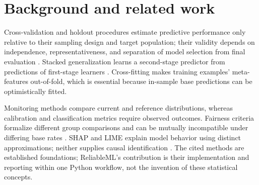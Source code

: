 \documentclass[conference]{IEEEtran}
\begin{document}
\section{Background and related work}
Cross-validation and holdout procedures estimate predictive performance only relative to their sampling design and target population; their validity depends on independence, representativeness, and separation of model selection from final evaluation \cite{arlot2010,kohavi1995}. Stacked generalization learns a second-stage predictor from predictions of first-stage learners \cite{wolpert1992}. Cross-fitting makes training examples' meta-features out-of-fold, which is essential because in-sample base predictions can be optimistically fitted.

Monitoring methods compare current and reference distributions, whereas calibration and classification metrics require observed outcomes. Fairness criteria formalize different group comparisons and can be mutually incompatible under differing base rates \cite{hardt2016,chouldechova2017}. SHAP and LIME explain model behavior using distinct approximations; neither supplies causal identification \cite{lundberg2017,ribeiro2016}. The cited methods are established foundations; ReliableML's contribution is their implementation and reporting within one Python workflow, not the invention of these statistical concepts.
\end{document}
